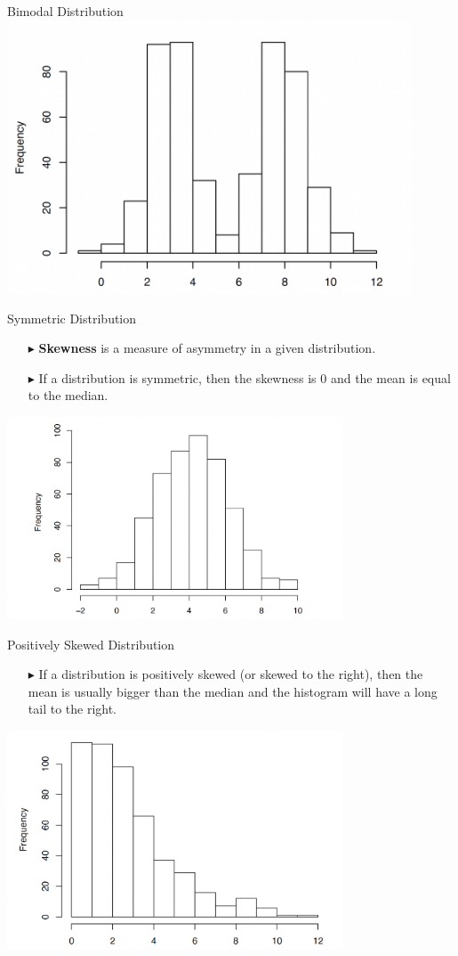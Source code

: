 \documentclass[12pt]{beamer}
\begin{document}
\begin{frame}{Bimodal Distribution}
	\centering
	\includegraphics[width=12cm]{bimodal.png}
\end{frame}
\begin{frame}{Symmetric Distribution}
	\begin{itemize}
		\item[$\blacktriangleright$] {\bf Skewness} is a measure of asymmetry in a given distribution.
		\item[$\blacktriangleright$] If a distribution is symmetric, then the skewness is 0 and the mean is equal to the median.
	\end{itemize}
	\centering
	\includegraphics[width=10cm]{symme.png}
\end{frame}
\begin{frame}{Positively Skewed Distribution}
	\begin{itemize}
		\item[$\blacktriangleright$] If a distribution is positively skewed (or skewed to the right), then the mean is usually bigger than the median and the histogram will have a long tail to the right.
	\end{itemize}
	\centering
	\includegraphics[width=10cm]{ps.png}
\end{frame}
\end{document}
